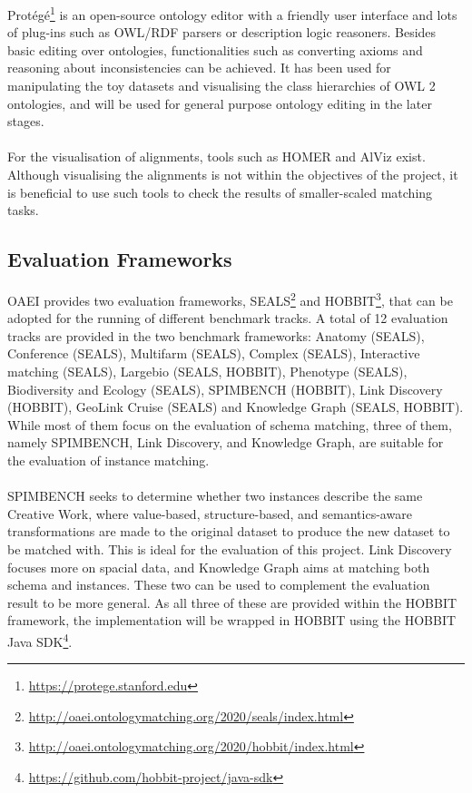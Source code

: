 Protégé\footnote{\url{https://protege.stanford.edu}} \cite{DBLP:journals/aimatters/Musen15} is an open-source ontology editor with a friendly user interface and lots of plug-ins such as OWL/RDF parsers or description logic reasoners. Besides basic editing over ontologies, functionalities such as converting axioms and reasoning about inconsistencies can be achieved. It has been used for manipulating the toy datasets and visualising the class hierarchies of OWL 2 ontologies, and will be used for general purpose ontology editing in the later stages.
\\\\
For the visualisation of alignments, tools such as HOMER and AlViz \cite{DBLP:conf/iv/LanzenbergerS06} exist. Although visualising the alignments is not within the objectives of the project, it is beneficial to use such tools to check the results of smaller-scaled matching tasks.

\subsection{Evaluation Frameworks}

OAEI provides two evaluation frameworks, SEALS\footnote{\url{http://oaei.ontologymatching.org/2020/seals/index.html}} and HOBBIT\footnote{\url{http://oaei.ontologymatching.org/2020/hobbit/index.html}}, that can be adopted for the running of different benchmark tracks. A total of 12 evaluation tracks are provided in the two benchmark frameworks: Anatomy (SEALS), Conference (SEALS), Multifarm (SEALS), Complex (SEALS), Interactive matching (SEALS), Largebio (SEALS, HOBBIT), Phenotype (SEALS), Biodiversity and Ecology (SEALS), SPIMBENCH (HOBBIT), Link Discovery (HOBBIT), GeoLink Cruise (SEALS) and Knowledge Graph (SEALS, HOBBIT). While most of them focus on the evaluation of schema matching, three of them, namely SPIMBENCH, Link Discovery, and Knowledge Graph, are suitable for the evaluation of instance matching.
\\\\
SPIMBENCH seeks to determine whether two instances describe the same Creative Work, where value-based, structure-based, and semantics-aware transformations are made to the original dataset to produce the new dataset to be matched with. This is ideal for the evaluation of this project. Link Discovery focuses more on spacial data, and Knowledge Graph aims at matching both schema and instances. These two can be used to complement the evaluation result to be more general. As all three of these are provided within the HOBBIT framework, the implementation will be wrapped in HOBBIT using the HOBBIT Java SDK\footnote{\url{https://github.com/hobbit-project/java-sdk}}.

